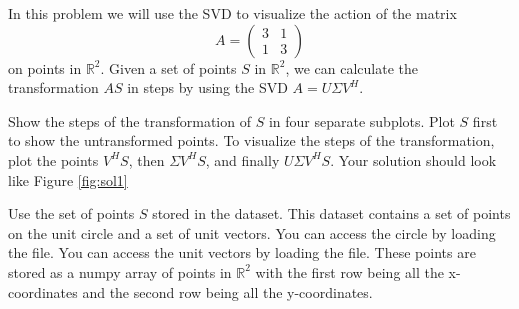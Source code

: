 \begin{problem}
In this problem we will use the SVD to visualize the action of the matrix
\begin{equation}
A =  \begin{pmatrix}3 & 1\\1 & 3\end{pmatrix}
\end{equation}
on points in $\mathbb{R}^2$.
Given a set of points $S$ in $\mathbb{R}^2$, we can calculate the transformation $AS$ in steps by using the SVD $A = U\Sigma V^H$.

Show the steps of the transformation of $S$ in four separate subplots.
Plot $S$ first to show the untransformed points.
To visualize the steps of the transformation, plot the points $V^HS$, then $\Sigma V^HS$, and finally $U\Sigma V^HS$.
Your solution should look like Figure \ref{fig:sol1}

Use the set of points $S$ stored in the  dataset.
This dataset contains a set of points on the unit circle and a set of unit vectors. 
You can access the circle by loading the  file. 
You can access the unit vectors by loading the  file. 
These points are stored as a numpy array of points in $\mathbb{R}^2$ with the first row being all the x-coordinates and the second row being all the y-coordinates.
\end{problem}



